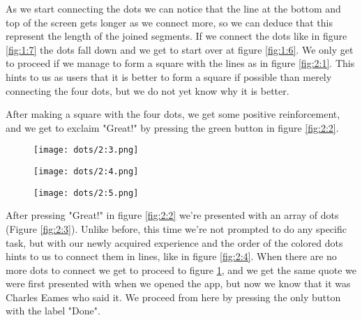 As we start connecting the dots we can notice that the line at the bottom and top of the screen gets longer as we connect more, so we can deduce that this represent the length of the joined segments. If we connect the dots like in figure \ref{fig:1:7} the dots fall down and we get to start over at figure \ref{fig:1:6}. We only get to proceed if we manage to form a square with the lines as in figure \ref{fig:2:1}. This hints to us as users that it is better to form a square if possible than merely connecting the four dots, but we do not yet know why it is better.

After making a square with the four dots, we get some positive reinforcement, and we get to exclaim "Great!" by pressing the green button in figure \ref{fig:2:2}.

\begin{figure}
\centering
\captionsetup{format=multiline,font=footnotesize}
\begin{minipage}{.33333\textwidth}
  \centering
  \texttt{[image: dots/2:3.png]}
  \label{fig:2:3}
\end{minipage}%
\begin{minipage}{.33333\textwidth}
  \centering
  \texttt{[image: dots/2:4.png]}
  \label{fig:2:4}
\end{minipage}%
\begin{minipage}{.33333\textwidth}
  \centering
  \texttt{[image: dots/2:5.png]}
  \label{fig:2:5}
\end{minipage}
\end{figure}

After pressing "Great!" in figure \ref{fig:2:2} we're presented with an array of dots (Figure \ref{fig:2:3}). Unlike before, this time we're not prompted to do any specific task, but with our newly acquired experience and the order of the colored dots hints to us to connect them in lines, like in figure \ref{fig:2:4}. When there are no more dots to connect we get to proceed to figure \ref{fig:2:5}, and we get the same quote we were first presented with when we opened the app, but now we know that it was Charles Eames who said it. We proceed from here by pressing the only button with the label "Done".

